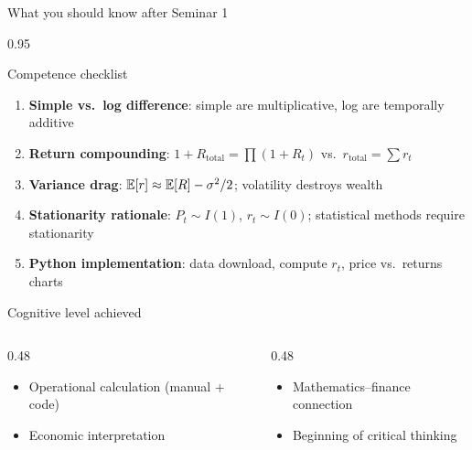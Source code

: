 \documentclass[9pt, aspectratio=169, t]{beamer}
\begin{document}
\begin{frame}{What you should know after Seminar 1}
    \begin{cminipage}{0.95\textwidth}
    \begin{block}{Competence checklist}
    \begin{enumerate}\setlength{\itemsep}{0pt}
        \item[\checkmark] \textbf{Simple vs.\ log difference}: simple are multiplicative, log are temporally additive
        \item[\checkmark] \textbf{Return compounding}: $1 + R_{\text{total}} = \prod(1+R_t)$ vs.\ $r_{\text{total}} = \sum r_t$
        \item[\checkmark] \textbf{Variance drag}: $\mathbb{E}[r] \approx \mathbb{E}[R] - \sigma^2/2$; volatility destroys wealth
        \item[\checkmark] \textbf{Stationarity rationale}: $P_t \sim I(1)$, $r_t \sim I(0)$; statistical methods require stationarity
        \item[\checkmark] \textbf{Python implementation}: data download, compute $r_t$, price vs.\ returns charts
    \end{enumerate}
    \end{block}
    \vspace{0.2cm}
    \begin{exampleblock}{Cognitive level achieved}
    \begin{columns}[T]
    \begin{column}{0.48\textwidth}
    \begin{itemize}\setlength{\itemsep}{0pt}
        \item Operational calculation (manual + code)
        \item Economic interpretation
    \end{itemize}
    \end{column}
    \begin{column}{0.48\textwidth}
    \begin{itemize}\setlength{\itemsep}{0pt}
        \item Mathematics--finance connection
        \item Beginning of critical thinking
    \end{itemize}
    \end{column}
    \end{columns}
    \end{exampleblock}
    \end{cminipage}
\end{frame}
\end{document}
